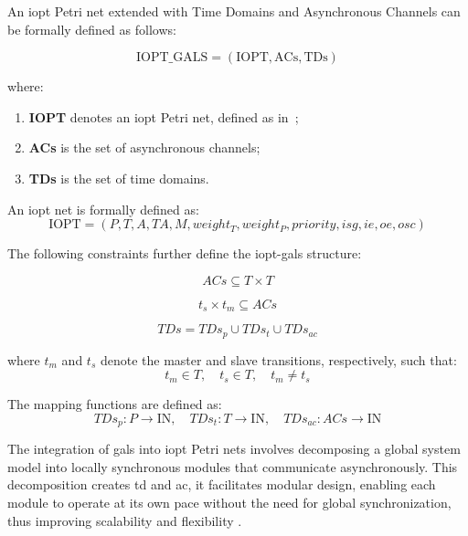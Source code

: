 An \gls{iopt} Petri net extended with Time Domains and Asynchronous Channels can be formally defined as follows:

\begin{equation}
\text{IOPT\_GALS} = (\text{IOPT}, \text{ACs}, \text{TDs})
\end{equation}

where:
\begin{enumerate}
    \item \textbf{IOPT} denotes an \gls{iopt} Petri net, defined as in~\cite{iopttools};
    \item \textbf{ACs} is the set of asynchronous channels;
    \item \textbf{TDs} is the set of time domains.
\end{enumerate}

An \gls{iopt} net is formally defined as:
\begin{equation}
\text{IOPT} = (P, T, A, TA, M, weight_T, weight_P, priority, isg, ie, oe, osc)
\end{equation}

The following constraints further define the \gls{iopt}-\gls{gals} structure:

\begin{equation}
ACs \subseteq T \times T
\end{equation}

\begin{equation}
t_s \times t_m \subseteq ACs
\end{equation}

\begin{equation}
TDs = TDs_p \cup TDs_t \cup TDs_{ac}
\end{equation}

\noindent where \( t_m \) and \( t_s \) denote the master and slave transitions, respectively, such that:
\[
t_m \in T, \quad t_s \in T, \quad t_m \neq t_s
\]

\noindent The mapping functions are defined as:
\[
TDs_p : P \rightarrow \text{IN}, \quad TDs_t : T \rightarrow \text{IN}, \quad TDs_{ac} : ACs \rightarrow \text{IN}
\]



The integration of \gls{gals} into \gls{iopt} Petri nets involves decomposing a global system model into locally synchronous modules that communicate asynchronously. This decomposition creates \gls{td} and \gls{ac}, it facilitates modular design, enabling each module to operate at its own pace without the need for global synchronization, thus improving scalability and flexibility \cite{galsactd}.




